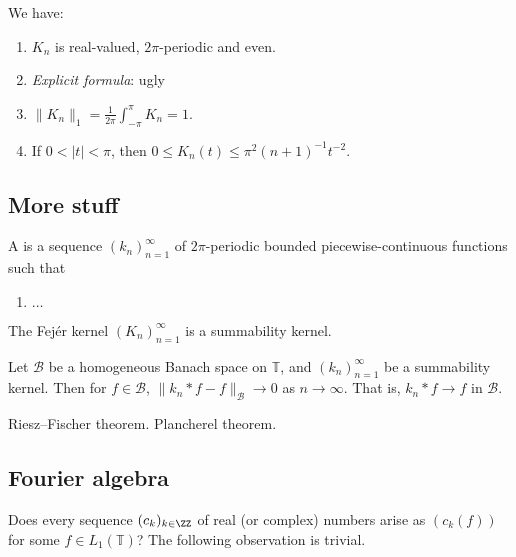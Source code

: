 \begin{theorem}
We have:
\begin{enumerate}
\item $K_n$ is real-valued, $2\pi$-periodic and even.
\item \emph{Explicit formula}: ugly %
\item $\displaystyle \| K_n \|_1 = \frac{1}{2\pi} \int_{-\pi}^{\pi} K_n = 1$.
\item If $0 < |t| < \pi$, then $0 \leq K_n(t) \leq \pi^2 (n+1)^{-1} t^{-2}$.
\end{enumerate}
\end{theorem}

\subsection{More stuff}

\begin{definition}
A  is a sequence $(k_n)_{n=1}^\infty$ of $2\pi$-periodic bounded piecewise-continuous functions such that
\begin{enumerate}
\item $\ldots$
\end{enumerate}
\end{definition}

\begin{proposition}
The Fej\'er kernel $(K_n)_{n=1}^\infty$ is a summability kernel.
\end{proposition}

\begin{theorem}
Let $\mathcal B$ be a homogeneous Banach space on $\mathbb{T}$, and $(k_n)_{n=1}^\infty$ be a summability kernel. Then for $f \in \mathcal{B}$, $\| k_n * f - f \|_{\mathcal B} \to 0$ as $n \to \infty$. That is, $k_n * f \to f$ in $\mathcal B$.
\end{theorem}

Riesz--Fischer theorem. Plancherel theorem.

\subsection{Fourier algebra}


Does every sequence $(c_k)_{k \in \ZZ}$ of real (or complex) numbers arise as $(c_k(f))$ for some $f \in L_1(\mathbb{T})$? The following observation is trivial.

